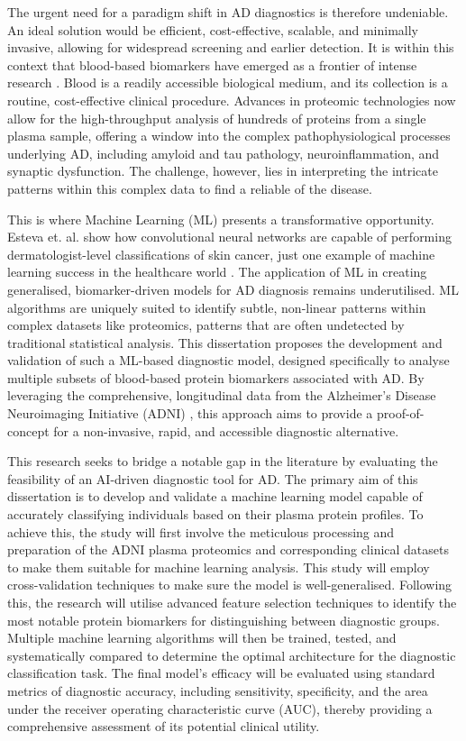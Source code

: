 \documentclass[a4paper,12pt]{article}
\begin{document}
The urgent need for a paradigm shift in AD diagnostics is therefore undeniable. An ideal solution would be efficient, cost-effective, scalable, and minimally invasive, allowing for widespread screening and earlier detection. It is within this context that blood-based biomarkers have emerged as a frontier of intense research \cite{scholl2024challenges}. Blood is a readily accessible biological medium, and its collection is a routine, cost-effective clinical procedure. Advances in proteomic technologies now allow for the high-throughput analysis of hundreds of proteins from a single plasma sample, offering a window into the complex pathophysiological processes underlying AD, including amyloid and tau pathology, neuroinflammation, and synaptic dysfunction. The challenge, however, lies in interpreting the intricate patterns within this complex data to find a reliable  of the disease.

This is where Machine Learning (ML) presents a transformative opportunity. Esteva et. al. show how convolutional neural networks are capable of performing dermatologist-level classifications of skin cancer, just one example of machine learning success in the healthcare world \cite{esteva2017dermatologist}. The application of ML in creating generalised, biomarker-driven models for AD diagnosis remains underutilised. ML algorithms are uniquely suited to identify subtle, non-linear patterns within complex datasets like proteomics, patterns that are often undetected by traditional statistical analysis. This dissertation proposes the development and validation of such a ML-based diagnostic model, designed specifically to analyse multiple subsets of blood-based protein biomarkers associated with AD. By leveraging the comprehensive, longitudinal data from the Alzheimer's Disease Neuroimaging Initiative (ADNI) \cite{adni_biofluid_biomarker}, this approach aims to provide a proof-of-concept for a non-invasive, rapid, and accessible diagnostic alternative.

This research seeks to bridge a notable gap in the literature by evaluating the feasibility of an AI-driven diagnostic tool for AD. The primary aim of this dissertation is to develop and validate a machine learning model capable of accurately classifying individuals based on their plasma protein profiles. To achieve this, the study will first involve the meticulous processing and preparation of the ADNI plasma proteomics and corresponding clinical datasets to make them suitable for machine learning analysis. This study will employ cross-validation techniques to make sure the model is well-generalised. Following this, the research will utilise advanced feature selection techniques to identify the most notable protein biomarkers for distinguishing between diagnostic groups. Multiple machine learning algorithms will then be trained, tested, and systematically compared to determine the optimal architecture for the diagnostic classification task. The final model's efficacy will be evaluated using standard metrics of diagnostic accuracy, including sensitivity, specificity, and the area under the receiver operating characteristic curve (AUC), thereby providing a comprehensive assessment of its potential clinical utility.
\end{document}
